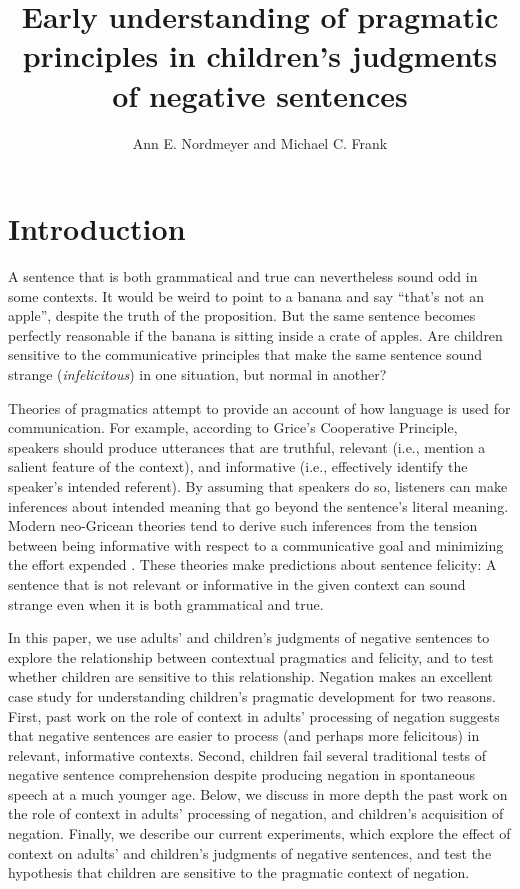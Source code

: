 \documentclass[man, noapacite]{apa2}
\title{Early understanding of pragmatic principles in children's judgments of negative sentences}
\author{Ann E. Nordmeyer and Michael C. Frank}
\affiliation{Department of Psychology, Stanford University}
\begin{document}
\maketitle


\section{Introduction}

A sentence that is both grammatical and true can nevertheless sound odd in some contexts. It would be weird to point to a banana and say ``that's not an apple'', despite the truth of the proposition. But the same sentence becomes perfectly reasonable if the banana is sitting inside a crate of apples. Are children sensitive to the communicative principles that make the same sentence sound strange (\emph{infelicitous}) in one situation, but normal in another?

Theories of pragmatics attempt to provide an account of how language is used for communication. For example, according to Grice's \citeyear{grice1975} Cooperative Principle, speakers should produce utterances that are truthful, relevant (i.e., mention a salient feature of the context), and informative (i.e., effectively identify the speaker's intended referent). By assuming that speakers do so, listeners can make inferences about intended meaning that go beyond the sentence's literal meaning. Modern neo-Gricean theories tend to derive such inferences from the tension between being informative with respect to a communicative goal and minimizing the effort expended \cite{horn1984,levinson2000,frank2012}. These theories make predictions about sentence felicity: A sentence that is not relevant or informative in the given context can sound strange even when it is both grammatical and true.

In this paper, we use adults' and children's judgments of negative sentences to explore the relationship between contextual pragmatics and felicity, and to test whether children are sensitive to this relationship. Negation makes an excellent case study for understanding children's pragmatic development for two reasons. First, past work on the role of context in adults' processing of negation suggests that negative sentences are easier to process (and perhaps more felicitous) in relevant, informative contexts. Second, children fail several traditional tests of negative sentence comprehension despite producing negation in spontaneous speech at a much younger age. Below, we discuss in more depth the past work on the role of context in adults' processing of negation, and children's acquisition of negation. Finally, we describe our current experiments, which explore the effect of context on adults' and children's judgments of negative sentences, and test the hypothesis that children are sensitive to the pragmatic context of negation.
\end{document}
